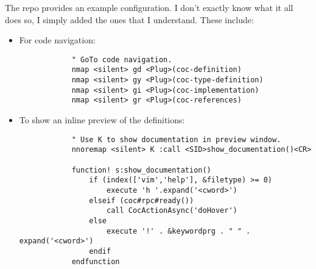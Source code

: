 The repo \cite{neoclide2020conquer} provides an example configuration. I don't
exactly know what it all does so, I simply added the ones that I understand.
These include:
\begin{itemize}
    \item For code navigation:
        \begin{lstlisting}
            " GoTo code navigation.
            nmap <silent> gd <Plug>(coc-definition)
            nmap <silent> gy <Plug>(coc-type-definition)
            nmap <silent> gi <Plug>(coc-implementation)
            nmap <silent> gr <Plug>(coc-references)
        \end{lstlisting}
    \item To show an inline preview of the definitions:
        \begin{lstlisting}
            " Use K to show documentation in preview window.
            nnoremap <silent> K :call <SID>show_documentation()<CR>

            function! s:show_documentation()
                if (index(['vim','help'], &filetype) >= 0)
                    execute 'h '.expand('<cword>')
                elseif (coc#rpc#ready())
                    call CocActionAsync('doHover')
                else
                    execute '!' . &keywordprg . " " . expand('<cword>')
                endif
            endfunction
        \end{lstlisting}
\end{itemize}


